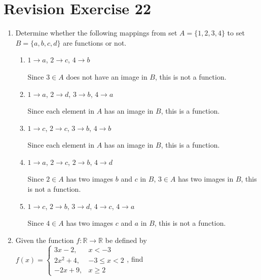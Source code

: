 \documentclass[12pt]{report}
\begin{document}
\newpage

\section{Revision Exercise 22}

\begin{enumerate}
  \item Determine whether the following mappings from set $A = \{1, 2, 3, 4\}$ to set
        $B = \{a, b, c, d\}$ are functions or not.
        \begin{enumerate}
          \item $1 \to a$, $2 \to c$, $4 \to b$
                \sol{}

                Since $3 \in A$ does not have an image in $B$, this is not a function.

          \item $1 \to a$, $2 \to d$, $3 \to b$, $4 \to a$
                \sol{}

                Since each element in $A$ has an image in $B$, this is a function.

          \item $1 \to c$, $2 \to c$, $3 \to b$, $4 \to b$
                \sol{}

                Since each element in $A$ has an image in $B$, this is a function.

          \item $1 \to a$, $2 \to c$, $2 \to b$, $4 \to d$
                \sol{}

                Since $2 \in A$ has two images $b$ and $c$ in $B$, $3 \in A$ has two images in
                $B$, this is not a function.

          \item $1 \to c$, $2 \to b$, $3 \to d$, $4 \to c$, $4 \to a$
                \sol{}

                Since $4 \in A$ has two images $c$ and $a$ in $B$, this is not a function.
        \end{enumerate}

  \item Given the function $f: \mathbb{R} \to \mathbb{R}$ be defined by $f (x) =
          \left\{\begin{array}{rl}
            3x - 2,   & x < -3        \\
            2x^2 + 4, & -3 \leq x < 2 \\
            -2x + 9,  & x \geq 2
          \end{array}\right.$, find
        \begin{enumerate}
\end{enumerate}
\end{enumerate}
\end{document}
